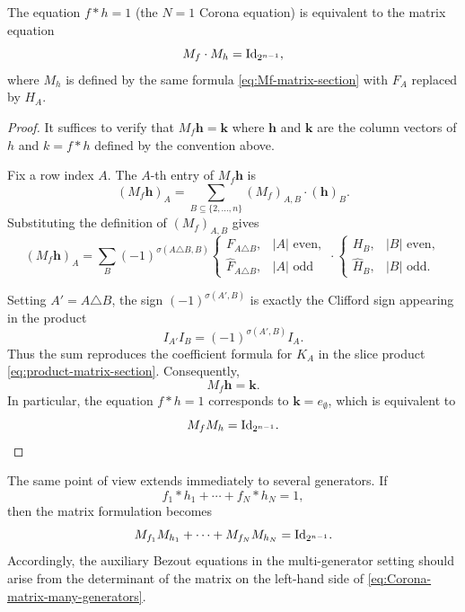 \documentclass[11pt]{amsart}
\begin{document}
\begin{prop}\label{prop:matrix_equiv}
The equation $f * h = 1$ (the $N=1$ Corona equation) is equivalent to the matrix equation
\[
M_f \cdot M_h = \textnormal{Id}_{2^{n-1}},
\]
where $M_h$ is defined by the same formula \eqref{eq:Mf-matrix-section} with $F_A$ replaced by $H_A$.
\end{prop}

\begin{proof}
It suffices to verify that $M_f \mathbf{h} = \mathbf{k}$ where $\mathbf{h}$ and $\mathbf{k}$
are the column vectors of $h$ and $k = f * h$ defined by the convention above.

Fix a row index $A$. The $A$-th entry of $M_f \mathbf{h}$ is
\[
(M_f \mathbf{h})_A = \sum_{B \subseteq \{2,\ldots,n\}} (M_f)_{A,B} \cdot (\mathbf{h})_B .
\]
Substituting the definition of $(M_f)_{A,B}$ gives
\[
(M_f \mathbf{h})_A
=
\sum_B
(-1)^{\sigma(A \triangle B,B)}
\begin{cases}
F_{A\triangle B}, & |A| \text{ even},\\
\hat{F}_{A\triangle B}, & |A| \text{ odd}
\end{cases}
\cdot
\begin{cases}
H_B, & |B| \text{ even},\\
\hat{H}_B, & |B| \text{ odd}.
\end{cases}
\]

Setting $A' = A \triangle B$, the sign
$(-1)^{\sigma(A',B)}$ is exactly the Clifford sign appearing in the product
\[
I_{A'} I_B = (-1)^{\sigma(A',B)} I_A .
\]
Thus the sum reproduces the coefficient formula for $K_A$ in the slice product
\eqref{eq:product-matrix-section}. Consequently,
\[
M_f \mathbf{h} = \mathbf{k}.
\]
In particular, the equation $f*h = 1$ corresponds to
$\mathbf{k} = e_\emptyset$, which is equivalent to
\[
M_f M_h = \textnormal{Id}_{2^{n-1}}.
\]
\end{proof}

The same point of view extends immediately to several generators.  If
$$
f_1*h_1+\cdots+f_N*h_N=1,
$$
then the matrix formulation becomes
\begin{equation}
\label{eq:Corona-matrix-many-generators}
M_{f_1}M_{h_1}+\cdots+M_{f_N}M_{h_N}=\textnormal{Id}_{2^{n-1}}.
\end{equation}
Accordingly, the auxiliary Bezout equations in the multi-generator setting should arise from the determinant of the matrix on the left-hand side of \eqref{eq:Corona-matrix-many-generators}.
\end{document}
